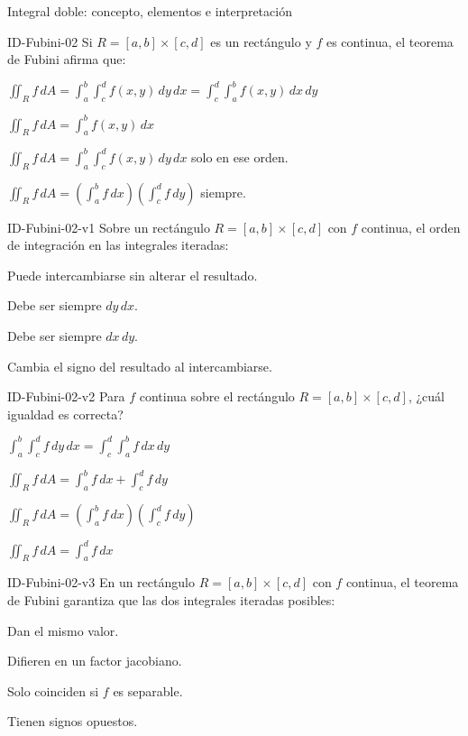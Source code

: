 \documentclass[a4,11pt]{aleph-notas}
\begin{document}
\begin{quiz}{Integral doble: concepto, elementos e interpretación}
\begin{multi}[]%
    {ID-Fubini-02}
    Si $R=[a,b]\times[c,d]$ es un rectángulo y $f$ es continua, el teorema de Fubini afirma que:
    \item* $\displaystyle\iint_R f\,dA = \int_a^b\!\!\int_c^d f(x,y)\,dy\,dx = \int_c^d\!\!\int_a^b f(x,y)\,dx\,dy$
    \item $\displaystyle\iint_R f\,dA = \int_a^b f(x,y)\,dx$
    \item $\displaystyle\iint_R f\,dA = \int_a^b\!\!\int_c^d f(x,y)\,dy\,dx$ solo en ese orden.
    \item $\displaystyle\iint_R f\,dA = \left(\int_a^b f\,dx\right)\left(\int_c^d f\,dy\right)$ siempre.
\end{multi}

\begin{multi}[]%
    {ID-Fubini-02-v1}
    Sobre un rectángulo $R=[a,b]\times[c,d]$ con $f$ continua, el orden de integración en las integrales iteradas:
    \item* Puede intercambiarse sin alterar el resultado.
    \item Debe ser siempre $dy\,dx$.
    \item Debe ser siempre $dx\,dy$.
    \item Cambia el signo del resultado al intercambiarse.
\end{multi}

\begin{multi}[]%
    {ID-Fubini-02-v2}
    Para $f$ continua sobre el rectángulo $R=[a,b]\times[c,d]$, ¿cuál igualdad es correcta?
    \item* $\displaystyle\int_a^b\!\!\int_c^d f\,dy\,dx = \int_c^d\!\!\int_a^b f\,dx\,dy$
    \item $\displaystyle\iint_R f\,dA = \int_a^b f\,dx + \int_c^d f\,dy$
    \item $\displaystyle\iint_R f\,dA = \left(\int_a^b f\,dx\right)\left(\int_c^d f\,dy\right)$
    \item $\displaystyle\iint_R f\,dA = \int_a^d f\,dx$
\end{multi}

\begin{multi}[]%
    {ID-Fubini-02-v3}
    En un rectángulo $R=[a,b]\times[c,d]$ con $f$ continua, el teorema de Fubini garantiza que las dos integrales iteradas posibles:
    \item* Dan el mismo valor.
    \item Difieren en un factor jacobiano.
    \item Solo coinciden si $f$ es separable.
    \item Tienen signos opuestos.
\end{multi}

\end{quiz}
\end{document}
